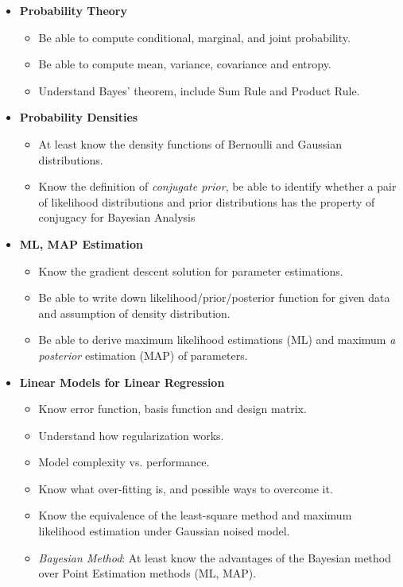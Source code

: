 \documentclass[11pt]{article} %
\begin{document}
\begin{itemize} 
\itemsep -2pt
\item {\bf Probability Theory}
\begin{itemize}
\itemsep -2pt
\item Be able to compute conditional, marginal, and joint probability.
\item Be able to compute mean, variance, covariance and entropy.
\item Understand Bayes' theorem, include Sum Rule and Product Rule.
\end{itemize}
\item {\bf Probability Densities}
\begin{itemize}
\itemsep -2pt
\item At least know the density functions of Bernoulli and Gaussian distributions.
\item Know the definition of {\em conjugate prior}, be able to identify whether a pair of likelihood distributions and prior distributions has the property of conjugacy for Bayesian Analysis
\end{itemize}
\item {\bf ML, MAP Estimation}
\begin{itemize}
\itemsep -2pt
\item Know the gradient descent solution for parameter estimations.
\item Be able to write down likelihood/prior/posterior function for given data and assumption of density distribution.
\item Be able to derive maximum likelihood estimations (ML) and maximum {\em a posterior} estimation (MAP) of parameters.
\end{itemize}
\item {\bf Linear Models for Linear Regression}
\begin{itemize}
\itemsep -2pt
\item Know error function, basis function and design matrix.
\item Understand how regularization works.
\item Model complexity vs. performance.
\item Know what over-fitting is, and possible ways to overcome it.
\item Know the equivalence of the least-square method and maximum likelihood estimation under Gaussian noised model.
\item {\em Bayesian Method}: At least know the advantages of the Bayesian method over Point Estimation methods (ML, MAP).

\end{itemize}
\end{itemize}
\end{document}
